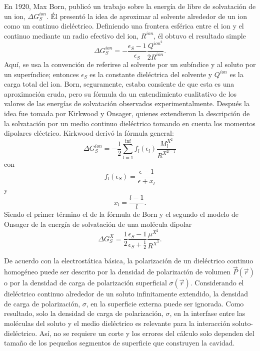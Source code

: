 En 1920, Max Born, public\'o un trabajo sobre la energ\'ia de libre
de solvataci\'on de un ion, $\Delta G^{ion}_{S}$. \'El present\'o la 
idea de aproximar al solvente alrededor de un ion como un continuo
diel\'ectrico. Definiendo una frontera esf\'erica entre el ion y el
continuo mediante un radio efectivo del ion, $R^{ion}$, \'el obtuvo 
el resultado simple 
$$\Delta G^{ion}_{S}=-\frac{\epsilon_S-1}{\epsilon_S}\frac{Q^{ion^2}}
{2R^{ion}}.$$
Aqu\'i, se usa la convenci\'on de referirse al solvente por un 
sub\'indice y al soluto por un super\'indice; entonces $\epsilon_S$ 
es la constante diel\'ectrica del solvente y $Q^{ion}$ es la carga 
total del ion. Born, seguramente, estaba consiente de que esta es una
aproximaci\'on cruda, pero su f\'ormula da un entendimiento 
cualitativo de los valores de las energ\'ias de solvataci\'on 
observados experimentalmente. Despu\'es la idea fue tomada por 
Kirkwood y Onsager, quienes extendieron la descripci\'on de la 
solvataci\'on por un medio continuo diel\'ectrico tomando en cuenta 
los momentos dipolares el\'ectrico. Kirkwood deriv\'o la f\'ormula 
general:
$$\Delta G^{ion}_{S}=-\frac{1}{2}\sum^{\inf}_{l=1}f_l(\epsilon_l)
\frac{M^{X^2}_l}{R^{X^{2l-1}}}$$
con
$$f_l(\epsilon_S)=\frac{\epsilon-1}{\epsilon + x_l}$$
y 
$$x_l=\frac{l-1}{l}.$$
Siendo el primer t\'ermino el de la f\'ormula de Born y el segundo el
modelo de Onsager de la energ\'ia de solvataci\'on de una mol\'ecula 
dipolar
$$\Delta G^X_S=\frac{1}{2}\frac{\epsilon_S-1}{\epsilon_S+\frac{1}{2}}
\frac{\mu^{X^2}}{R^{X^3}}.$$

De acuerdo con la electrost\'atica b\'asica, la polarizaci\'on de un 
diel\'ectrico continuo homog\'eneo puede ser descrito por la densidad de
polarizaci\'on de volumen $\vec P(\vec r)$ o por la densidad de carga
de polarizaci\'on superficial $\sigma(\vec r)$. Considerando el 
diel\'ectrico continuo alrededor de un soluto infinitamente 
extendido, la densidad de carga de polarizaci\'on, $\sigma$, en la
superficie externa puede ser ignorada. Como resultado, solo la 
densidad de carga de polarizaci\'on, $\sigma$, en la interfase entre
las mol\'eculas del soluto y el medio diel\'ectrico es relevante para
la interacci\'on soluto-diel\'ectrico. As\'i, no se requiere un corte
y los errores del c\'alculo solo dependen del tama\~no de los 
peque\~nos segmentos de superficie que construyen la cavidad.

